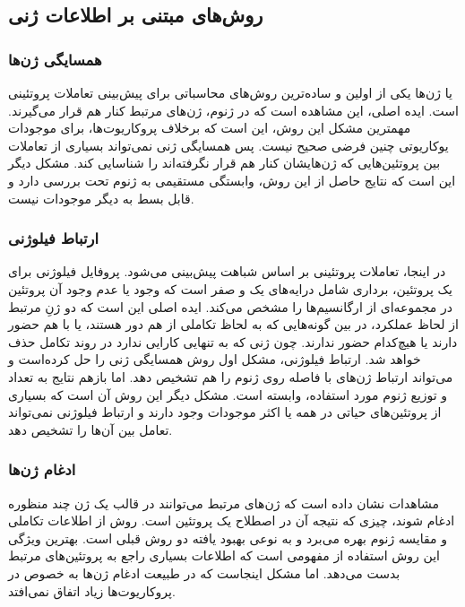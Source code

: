 \subsection{روش‌های مبتنی بر اطلاعات ژنی}
\subsubsection{همسایگی ژن‌ها}
 یا  ژن‌ها یکی از اولین و ساده‌ترین روش‌های محاسباتی برای پیش‌بینی تعاملات پروتئینی است. ایده اصلی، این مشاهده است که در ژنوم، ژن‌های مرتبط کنار هم قرار می‌گیرند. مهمترین مشکل این روش، این است که برخلاف پروکاریوت‌ها، برای موجودات یوکاریوتی چنین فرضی صحیح نیست. پس همسایگی ژنی نمی‌تواند بسیاری از تعاملات بین پروتئین‌هایی که ژن‌هایشان کنار هم قرار نگرفته‌اند را شناسایی کند. مشکل دیگر این است که نتایج حاصل از این روش، وابستگی مستقیمی به ژنوم تحت بررسی دارد و قابل بسط به دیگر موجودات نیست.

\subsubsection{ارتباط فیلوژنی}
در اینجا، تعاملات پروتئینی بر اساس شباهت  پیش‌بینی می‌شود. پروفایل فیلوژنی برای یک پروتئین، برداری شامل درایه‌های یک و صفر است که وجود یا عدم وجود آن پروتئین در مجموعه‌ای از ارگانسیم‌ها را مشخص می‌کند. ایده اصلی این است که دو ژنِ مرتبط از لحاظ عملکرد، در بین گونه‌هایی که به لحاظ تکاملی از هم دور هستند، یا با هم حضور دارند یا هیچ‌کدام حضور ندارند. چون ژنی که به تنهایی کارایی ندارد در روند تکامل حذف خواهد شد. ارتباط فیلوژنی، مشکل اول روش همسایگی ژنی را حل کرده‌است و می‌تواند ارتباط ژن‌های با فاصله روی ژنوم را هم تشخیص دهد. اما بازهم نتایج به تعداد و توزیع ژنوم مورد استفاده، وابسته است. مشکل دیگر این روش آن است که بسیاری از پروتئین‌های حیاتی در همه یا اکثر موجودات وجود دارند و ارتباط فیلوژنی نمی‌تواند تعامل بین آن‌ها را تشخیص دهد.

\subsubsection{ادغام ژن‌ها}
مشاهدات نشان داده است که ژن‌های مرتبط می‌توانند در قالب یک ژن چند منظوره ادغام شوند، چیزی که نتیجه آن در اصطلاح یک پروتئین  است. روش  از اطلاعات تکاملی و مقایسه ژنوم بهره می‌برد و به نوعی بهبود یافته دو روش قبلی است. بهترین ویژگی این روش استفاده از مفهومی است که اطلاعات بسیاری راجع به پروتئین‌های مرتبط بدست می‌دهد. اما مشکل اینجاست که در طبیعت ادغام ژن‌ها به خصوص در پروکاریوت‌ها زیاد اتفاق نمی‌افتد.

